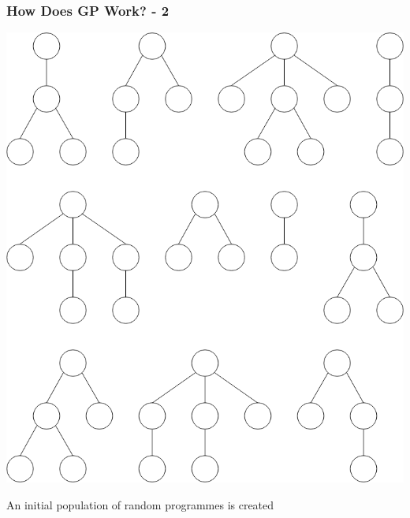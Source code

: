 \documentclass{beamer}
\begin{document}
		\begin{frame}
			
			\frametitle{How Does GP Work? - 2}
			
			\begin{center}
				
				\includegraphics[scale=0.2]{resources/2_gp_example_population}
				
				An initial population of random programmes is created
				
			\end{center}
			
		\end{frame}
	
\end{document}

